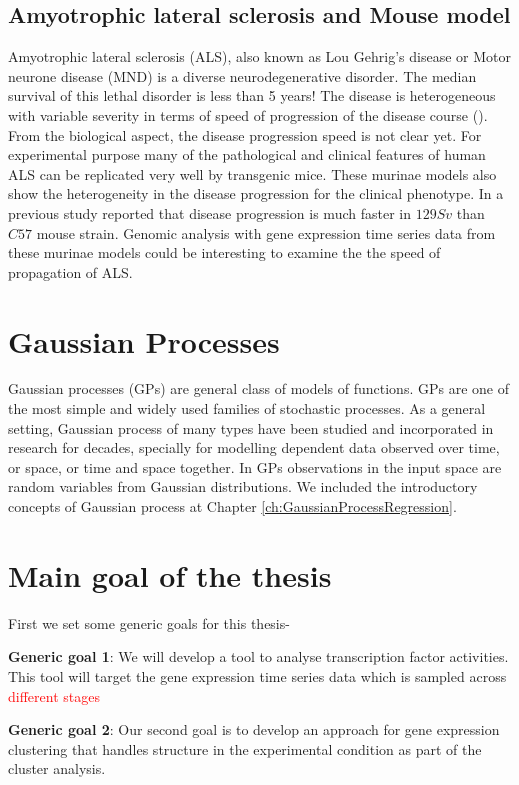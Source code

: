 \subsection{Amyotrophic lateral sclerosis and Mouse model}
Amyotrophic lateral sclerosis (ALS), also known as Lou Gehrig's disease or Motor neurone disease (MND) is a diverse neurodegenerative disorder. The median survival of this lethal disorder is less than 5 years! The disease is heterogeneous with variable severity in terms of speed of progression of the disease course (\cite{Brockington:2013, Peviani:2010}). From the biological aspect, the disease progression speed is not clear yet. For experimental purpose many of the pathological and clinical features of human ALS can be replicated very well by transgenic mice. These murinae models also show the heterogeneity in the disease progression for the clinical phenotype. In a previous study \cite{Pizzasegola:2009} reported that disease progression is much faster in $129Sv$ than $C57$ mouse strain. Genomic analysis with gene expression time series data from these murinae models could be interesting to examine the the speed of propagation of ALS.

\section{Gaussian Processes}
Gaussian processes (GPs) are general class of models of functions. GPs are one of the most simple and widely used families of stochastic processes. As a general setting, Gaussian process of many types have been studied and incorporated in research for decades, specially for modelling dependent data observed over time, or space, or time and space together. In GPs observations in the input space are random variables from Gaussian distributions. We included the introductory concepts of Gaussian process at Chapter \ref{ch:GaussianProcessRegression}.

\section{Main goal of the thesis}
First we set some generic goals for this thesis-

\textbf{Generic goal 1}: We will develop a tool to analyse transcription factor activities. This tool will target the gene expression time series data which is sampled across \textcolor{red} {different stages}

\textbf{Generic goal 2}: Our second goal is to develop an approach for gene expression clustering that handles structure in the experimental condition as part of the cluster analysis.


